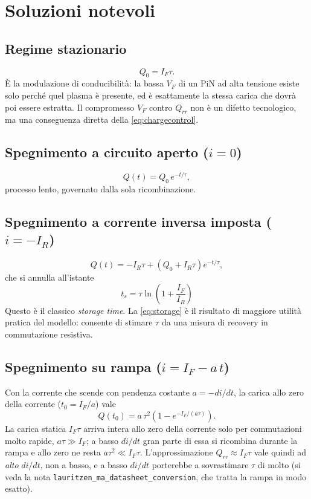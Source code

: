 \documentclass[11pt,a4paper]{article}
\begin{document}
\section{Soluzioni notevoli}

\subsection{Regime stazionario}
\begin{equation}
  Q_0 = I_F \tau .
\end{equation}
\`E la modulazione di conducibilit\`a: la bassa $V_F$ di un PiN ad alta tensione
esiste solo perch\'e quel plasma \`e presente, ed \`e esattamente la stessa carica che
dovr\`a poi essere estratta. Il compromesso $V_F$ contro $Q_{rr}$ non \`e un difetto
tecnologico, ma una conseguenza diretta della \eqref{eq:chargecontrol}.

\subsection{Spegnimento a circuito aperto ($i = 0$)}
\begin{equation}
  Q(t) = Q_0 \, e^{-t/\tau},
\end{equation}
processo lento, governato dalla sola ricombinazione.

\subsection{Spegnimento a corrente inversa imposta ($i = -I_R$)}
\begin{equation}
  Q(t) = -I_R \tau + \left( Q_0 + I_R \tau \right) e^{-t/\tau},
\end{equation}
che si annulla all'istante
\begin{equation}
  \boxed{\;
  t_s = \tau \ln\!\left( 1 + \frac{I_F}{I_R} \right)
  \;}
  \label{eq:storage}
\end{equation}
Questo \`e il classico \emph{storage time}. La \eqref{eq:storage} \`e il risultato di
maggiore utilit\`a pratica del modello: consente di stimare $\tau$ da una misura di
recovery in commutazione resistiva.

\subsection{Spegnimento su rampa ($i = I_F - a\,t$)}
\label{sec:rampa}
Con la corrente che scende con pendenza costante $a = -di/dt$, la carica allo zero
della corrente ($t_0 = I_F/a$) vale
\begin{equation}
  Q(t_0) = a\,\tau^2 \left(1 - e^{-I_F/(a\tau)}\right) .
  \label{eq:rampa}
\end{equation}
La carica statica $I_F\tau$ arriva intera allo zero della corrente solo per
commutazioni molto rapide, $a\tau \gg I_F$; a basso $di/dt$ gran parte di essa si
ricombina durante la rampa e allo zero ne resta $a\tau^2 \ll I_F\tau$. L'approssimazione
$Q_{rr} \approx I_F\tau$ vale quindi ad \emph{alto} $di/dt$, non a basso, e a basso
$di/dt$ porterebbe a sovrastimare $\tau$ di molto (si veda la nota
\texttt{lauritzen\_ma\_datasheet\_conversion}, che tratta la rampa in modo esatto).
\end{document}
